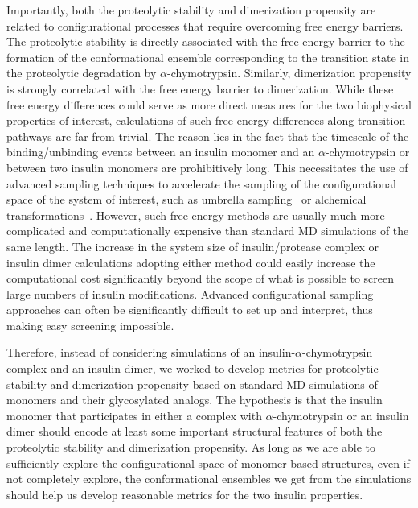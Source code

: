 \documentclass[sn-vancouver]{sn-jnl}
\begin{document}
Importantly, both the proteolytic stability and dimerization propensity are related to configurational processes that require overcoming free energy barriers. The proteolytic stability is directly associated with the free energy barrier to the formation of the conformational ensemble corresponding to the transition state in the proteolytic degradation by $\alpha$-chymotrypsin. Similarly, dimerization propensity is strongly correlated with the free energy barrier to dimerization. While these free energy differences could serve as more direct measures for the two biophysical properties of interest, calculations of such free energy differences along transition pathways are far from trivial. The reason lies in the fact that the timescale of the binding/unbinding events between an insulin monomer and an $\alpha$-chymotrypsin or between two insulin monomers are prohibitively long. This necessitates the use of advanced sampling techniques to accelerate the sampling of the configurational space of the system of interest, such as umbrella sampling~\cite{torrie1977nonphysical} or alchemical transformations~\cite{sugita2000replica, lyubartsev1992new}. However, such free energy methods are usually much more complicated and computationally expensive than standard MD simulations of the same length. The increase in the system size of insulin/protease complex or insulin dimer calculations adopting either method could easily increase the computational cost significantly beyond the scope of what is possible to screen large numbers of insulin modifications.  Advanced configurational sampling approaches can often be significantly difficult to set up and interpret, thus making easy screening impossible.

Therefore, instead of considering simulations of an insulin-$\alpha$-chymotrypsin complex and an insulin dimer, we worked to develop metrics for proteolytic stability and dimerization propensity based on standard MD simulations of monomers and their glycosylated analogs. The hypothesis is that the insulin monomer that participates in either a complex with $\alpha$-chymotrypsin or an insulin dimer should encode at least some important structural features of both the proteolytic stability and dimerization propensity. As long as we are able to sufficiently explore the configurational space of monomer-based structures, even if not completely explore, the conformational ensembles we get from the simulations should help us develop reasonable metrics for the two insulin properties. 
\end{document}

